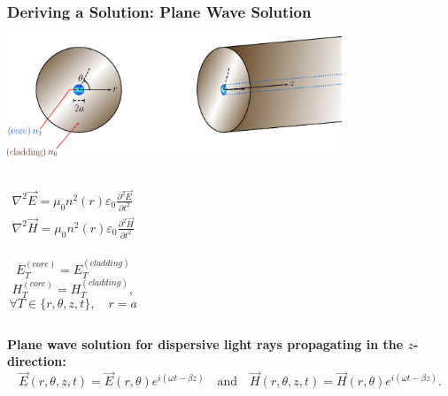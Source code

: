 \documentclass{beamer}
\begin{document}
\begin{frame}
\frametitle{\textbf{Deriving a Solution:} Plane Wave Solution}
\vspace{1.5mm}\hspace{1.2cm}\includegraphics[width=0.75\textwidth]{setUp.eps}
\begin{columns}
\begin{gather}
\nabla^2\vec{E}=\mu_0 n^2(r)\varepsilon_0\frac{\partial^2\vec{E}}{\partial t^2}\nonumber\\
\nabla^2\vec{H}=\mu_0 n^2(r)\varepsilon_0\frac{\partial^2\vec{H}}{\partial t^2}\nonumber
\end{gather}
\\
$$E_{T}^{(core)}=E_{T}^{(cladding)}$$ $$H_{T}^{(core)}=H_{T}^{(cladding)},$$ $$\forall T\in\{r,\theta,z,t\},\quad r=a$$
\end{columns}
\vspace{3mm}
\textbf{Plane wave solution for dispersive light rays propagating in the $z$-direction:}
$$\vec{E}(r,\theta,z,t)=\vec{E}(r,\theta)e^{i(\omega t-\beta z)}\quad\mbox{and}\quad\vec{H}(r,\theta,z,t)=\vec{H}(r,\theta)e^{i(\omega t-\beta z)}.$$
\end{frame}
\end{document}
